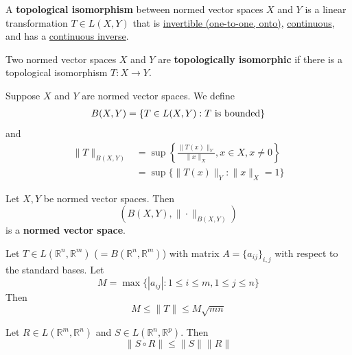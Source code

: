 \documentclass[11pt]{elegantbook}
\begin{document}
\begin{definition}
    \normalfont
    A \textbf{topological isomorphism} between normed vector spaces $X$ and $Y$ is a linear transformation $T \in L(X, Y)$ that is \underline{invertible (one-to-one, onto)}, \underline{continuous}, and has a \underline{continuous inverse}.

    Two normed vector spaces $X$ and $Y$ are \textbf{topologically isomorphic} if there is a topological isomorphism $T : X \rightarrow Y$.
\end{definition}

Suppose $X$ and $Y$ are normed vector spaces. We define
\begin{equation}
    \begin{aligned}
        B(X,Y)= \{T \in L(X, Y) : T\textnormal{ is bounded}\}
    \end{aligned}
    \nonumber
\end{equation}
and
\begin{equation}
    \begin{aligned}
        \|T\|_{B(X,Y)}&=\sup\left\{\frac{\|T(x)\|_Y}{\|x\|_X},x\in X, x\neq 0\right\}\\
        &=\sup\{\|T(x)\|_Y:\|x\|_X=1\}
    \end{aligned}
    \nonumber
\end{equation}


\begin{theorem}
    Let $X, Y$ be normed vector spaces. Then $$\left(B(X,Y), \|\cdot\|_{B(X,Y)}\right)$$
    is a \textbf{normed vector space}.
\end{theorem}

\begin{theorem}
    Let $T \in L(\mathbb{R}^n, \mathbb{R}^m)$ ($= B(\mathbb{R}^n, \mathbb{R}^m)$) with matrix $A = \{a_{ij}\}_{i,j}$ with respect to the standard bases. Let $$M=\max\{|a_{ij}|:1\leq i\leq m, 1\leq j\leq n\}$$
    Then $$M\leq \|T\|\leq M\sqrt{mn}$$
\end{theorem}

\begin{theorem}
    Let $R \in L(\mathbb{R}^m, \mathbb{R}^n)$ and $S \in L(\mathbb{R}^n, \mathbb{R}^p)$. Then $$\|S\circ R\|\leq\|S\|\|R\|$$
\end{theorem}
\end{document}
